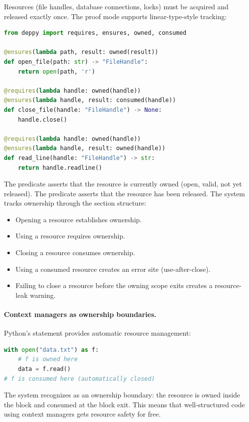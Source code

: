 \documentclass[11pt]{report}
\DeclareRobustCommand{\py}[1]{\texttt{\detokenize{#1}}}
\theoremstyle{definition}
\theoremstyle{plain}
\begin{document}
Resources (file handles, database connections, locks) must be acquired and
released exactly once. The proof mode supports linear-type-style tracking:

\begin{lstlisting}[style=deppy,language=Python]
from deppy import requires, ensures, owned, consumed

@ensures(lambda path, result: owned(result))
def open_file(path: str) -> "FileHandle":
    return open(path, 'r')

@requires(lambda handle: owned(handle))
@ensures(lambda handle, result: consumed(handle))
def close_file(handle: "FileHandle") -> None:
    handle.close()

@requires(lambda handle: owned(handle))
@ensures(lambda handle, result: owned(handle))
def read_line(handle: "FileHandle") -> str:
    return handle.readline()
\end{lstlisting}

The \py{owned(handle)} predicate asserts that the resource is currently owned
(open, valid, not yet released). The \py{consumed(handle)} predicate asserts
that the resource has been released. The system tracks ownership through the
section structure:

\begin{itemize}[nosep]
  \item Opening a resource establishes ownership.
  \item Using a resource requires ownership.
  \item Closing a resource consumes ownership.
  \item Using a consumed resource creates an error site (use-after-close).
  \item Failing to close a resource before the owning scope exits creates a
        resource-leak warning.
\end{itemize}

\paragraph{Context managers as ownership boundaries.}
Python's \py{with} statement provides automatic resource management:
\begin{lstlisting}[style=deppy,language=Python]
with open("data.txt") as f:
    # f is owned here
    data = f.read()
# f is consumed here (automatically closed)
\end{lstlisting}

The system recognizes \py{with} as an ownership boundary: the resource is
owned inside the block and consumed at the block exit. This means that
well-structured code using context managers gets resource safety for free.
\end{document}
